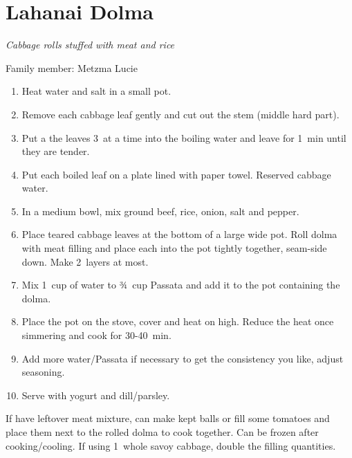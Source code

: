 \chapter{Lahanai Dolma}
\label{ch:lahanai_dolma}



\textit{Cabbage rolls stuffed with meat and rice}

Family member: Metzma Lucie

\begin{enumerate}
    \item Heat water and salt in a small pot.
    \item Remove each cabbage leaf gently and cut out the stem (middle hard part).
    \item Put a the leaves 3~at a time into the boiling water and leave for 1~min until they are tender.
    \item Put each boiled leaf on a plate lined with paper towel. Reserved cabbage water.
    \item In a medium bowl, mix ground beef, rice, onion, salt and pepper.
    \item Place teared cabbage leaves at the bottom of a large wide pot. Roll dolma with meat filling and place each into the pot tightly together, seam-side down. Make 2~layers at most.
    \item Mix 1~cup of water to ¾~cup Passata and add it to the pot containing the dolma.
    \item Place the pot on the stove, cover and heat on high. Reduce the heat once simmering and cook for 30-40~min.
    \item Add more water/Passata if necessary to get the consistency you like, adjust seasoning.
    \item Serve with yogurt and dill/parsley.
\end{enumerate}

If have leftover meat mixture, can make kept balls or fill some tomatoes and place them next to the rolled dolma to cook together.
Can be frozen after cooking/cooling.
If using 1~whole savoy cabbage, double the filling quantities.
